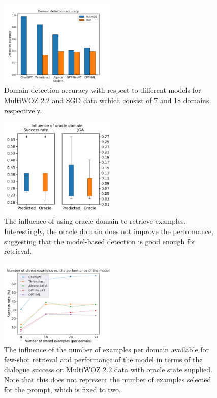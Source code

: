 \begin{figure}[t]
    \centering
    \includegraphics[width=0.49\textwidth]{images/domain-detections.png}
    \caption{Domain detection accuracy with respect to different models for MultiWOZ 2.2 and SGD data wchich consist of 7 and 18 domains, respectively.}
    \label{07:fig:domains}
\end{figure}
\begin{figure}[t]
    \centering
    \includegraphics[width=0.49\textwidth]{images/oracle_domains.png}
    \caption{The influence of using oracle domain to retrieve examples. Interestingly, the oracle domain does not improve the performance, suggesting that the model-based detection is good enough for retrieval.}
    \label{07:fig:oracle_domains}
\end{figure}
\begin{figure}[t]
    \centering
    \includegraphics[width=0.49\textwidth]{images/shots.png}
    \caption{The influence of the number of examples per domain available for few-shot retrieval and performance of the model in terms of the dialogue success on MultiWOZ 2.2 data with oracle state supplied. Note that this does not represent the number of examples selected for the prompt, which is fixed to two.}
    \label{07:fig:shots}
\end{figure}

